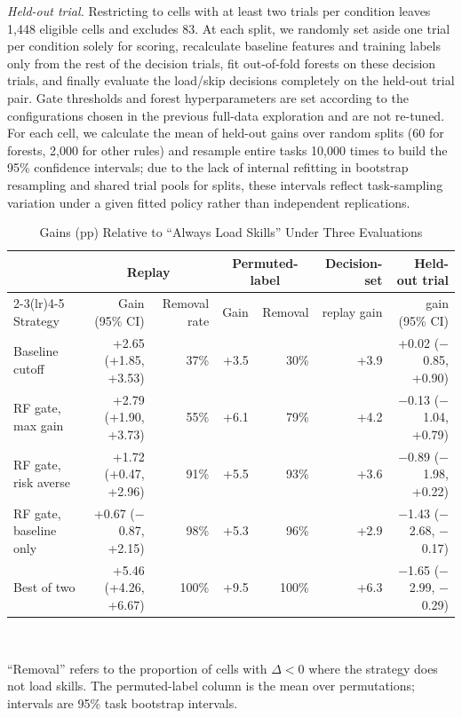 \documentclass[10pt,conference]{IEEEtran}
\begin{document}
\emph{Held-out trial.} Restricting to cells with at least two trials per condition leaves 1,448 eligible cells and excludes 83. At each split, we randomly set aside one trial per condition solely for scoring, recalculate baseline features and training labels only from the rest of the decision trials, fit out-of-fold forests on these decision trials, and finally evaluate the load/skip decisions completely on the held-out trial pair. Gate thresholds and forest hyperparameters are set according to the configurations chosen in the previous full-data exploration and are not re-tuned. For each cell, we calculate the mean of held-out gains over random splits (60 for forests, 2,000 for other rules) and resample entire tasks 10,000 times to build the 95\% confidence intervals; due to the lack of internal refitting in bootstrap resampling and shared trial pools for splits, these intervals reflect task-sampling variation under a given fitted policy rather than independent replications.

\begin{table}[t]
\caption{Gains (pp) Relative to ``Always Load Skills'' Under Three Evaluations}
\label{tab:gate}
\centering
\setlength{\tabcolsep}{5pt}
\begin{tabular}{@{}l r r r r r r@{}}
\toprule
 & \multicolumn{2}{c}{Replay} & \multicolumn{2}{c}{Permuted-label} & Decision-set & Held-out trial \\
\cmidrule(lr){2-3}\cmidrule(lr){4-5}
Strategy & Gain (95\% CI) & Removal rate & Gain & Removal & replay gain & gain (95\% CI) \\
\midrule
Baseline cutoff & +2.65 (+1.85, +3.53) & 37\% & +3.5 & 30\% & +3.9 & +0.02 ($-$0.85, +0.90) \\
RF gate, max gain & +2.79 (+1.90, +3.73) & 55\% & +6.1 & 79\% & +4.2 & $-$0.13 ($-$1.04, +0.79) \\
RF gate, risk averse & +1.72 (+0.47, +2.96) & 91\% & +5.5 & 93\% & +3.6 & $-$0.89 ($-$1.98, +0.22) \\
RF gate, baseline only & +0.67 ($-$0.87, +2.15) & 98\% & +5.3 & 96\% & +2.9 & $-$1.43 ($-$2.68, $-$0.17) \\
Best of two & +5.46 (+4.26, +6.67) & 100\% & +9.5 & 100\% & +6.3 & $-$1.65 ($-$2.99, $-$0.29) \\
\bottomrule
\end{tabular}\\[2pt]
\parbox{0.8\textwidth}{\footnotesize ``Removal'' refers to the proportion of cells with $\Delta<0$ where the strategy does not load skills. The permuted-label column is the mean over permutations; intervals are 95\% task bootstrap intervals.}
\end{table}
\end{document}

